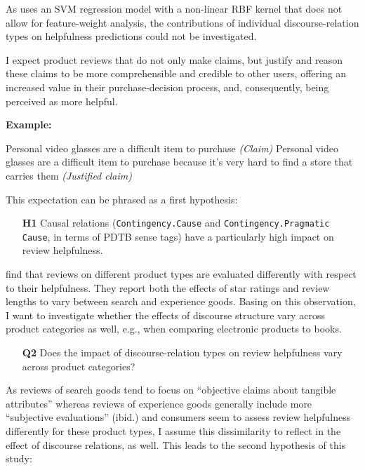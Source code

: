 \documentclass[
    a4paper,%
    12pt,%
    oneside,%
    toc=bibliography,
    final,
]{scrartcl}
\begin{document}
As \citet{Golly2017} uses an SVM regression model with a non-linear RBF kernel that does not allow for feature-weight analysis, the contributions of individual discourse-relation types on helpfulness predictions could not be investigated.

I expect product reviews that do not only make claims, but justify and reason these claims to be more comprehensible and credible to other users, offering an increased value in their purchase-decision process, and, consequently, being perceived as more helpful.

\textbf{Example:}
\vspace{-1em}

\begin{exe}
\ex Personal video glasses are a difficult item to purchase \textit{(Claim)}
\ex Personal video glasses are a difficult item to purchase because it’s very hard to find a store that carries them \textit{(Justified claim)}
\end{exe}
\vspace{-.5em}

This expectation can be phrased as a first hypothesis:

\begin{enumerate}[rightmargin=1cm]
\item[\textbf{H1}] Causal relations (\lstinline|Contingency.Cause| and \lstinline|Contingency.Pragmatic Cause|, in terms of PDTB sense tags) have a particularly high impact on review helpfulness.
\end{enumerate}

\citet{MudambiSchuff2010} find that reviews on different product types are evaluated differently with respect to their helpfulness. They report both the effects of star ratings and review lengths to vary between search and experience goods. Basing on this observation, I want to investigate whether the effects of discourse structure vary across product categories as well, e.g., when comparing electronic products to books.

\begin{enumerate}[rightmargin=1cm]
\item[\textbf{Q2}] Does the impact of discourse-relation types on review helpfulness vary across product categories?
\end{enumerate}

As reviews of search goods tend to focus on “objective claims about tangible attributes” \citep[189]{MudambiSchuff2010} whereas reviews of experience goods generally include more “subjective evaluations” (ibid.) and consumers seem to assess review helpfulness differently for these product types, I assume this dissimilarity to reflect in the effect of discourse relations, as well. This leads to the second hypothesis of this study:
\end{document}
